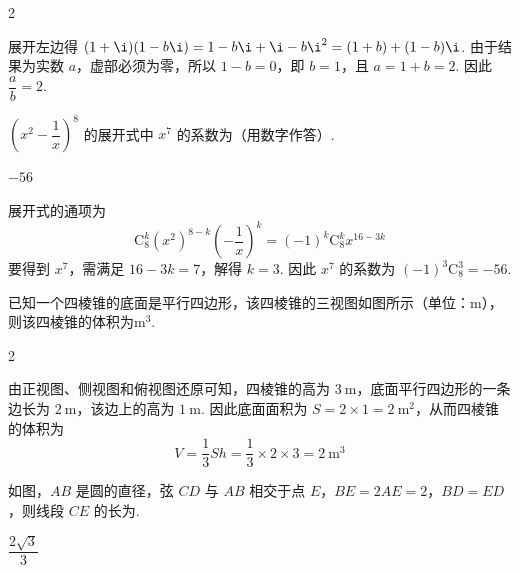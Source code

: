 \begin{answer}
2
\end{answer}

\begin{solution}
展开左边得
\((1+\i)(1-b\i)=1-b\i+\i-b\i^2=(1+b)+(1-b)\i\). 由于结果为实数 \(a\)，虚部必须为零，所以 \(1-b=0\)，即 \(b=1\)，且 \(a=1+b=2\). 因此 \(\dfrac ab=2\).
\end{solution}

\begin{problem}
\(\left(x^2-\dfrac1x\right)^8\) 的展开式中 \(x^7\) 的系数为\fillinblank{}（用数字作答）.
\end{problem}

\begin{answer}
\(-56\)
\end{answer}

\begin{solution}
展开式的通项为
\[\mathrm C_8^k(x^2)^{8-k}\left(-\dfrac1x\right)^k=(-1)^k\mathrm C_8^k x^{16-3k}\]
要得到 \(x^7\)，需满足 \(16-3k=7\)，解得 \(k=3\). 因此 \(x^7\) 的系数为
\((-1)^3\mathrm C_8^3=-56\).
\end{solution}

\begin{problem}
已知一个四棱锥的底面是平行四边形，该四棱锥的三视图如图所示（单位：\(\mathrm{m}\)），则该四棱锥的体积为\fillinblank{}\(\mathrm{m}^3\).

\end{problem}

\begin{answer}
2
\end{answer}

\begin{solution}
由正视图、侧视图和俯视图还原可知，四棱锥的高为 \(3\mathrm{~m}\)，底面平行四边形的一条边长为 \(2\mathrm{~m}\)，该边上的高为 \(1\mathrm{~m}\). 因此底面面积为
\(S=2\times1=2\mathrm{~m}^2\)，从而四棱锥的体积为
\[V=\dfrac13Sh=\dfrac13\times2\times3=2\mathrm{~m}^3\]
\end{solution}

\begin{problem}
如图，\(AB\) 是圆的直径，弦 \(CD\) 与 \(AB\) 相交于点 \(E\)，\(BE=2AE=2\)，\(BD=ED\)，则线段 \(CE\) 的长为\fillinblank{}.

\end{problem}

\begin{answer}
\(\dfrac{2\sqrt{3}}{3}\)
\end{answer}

